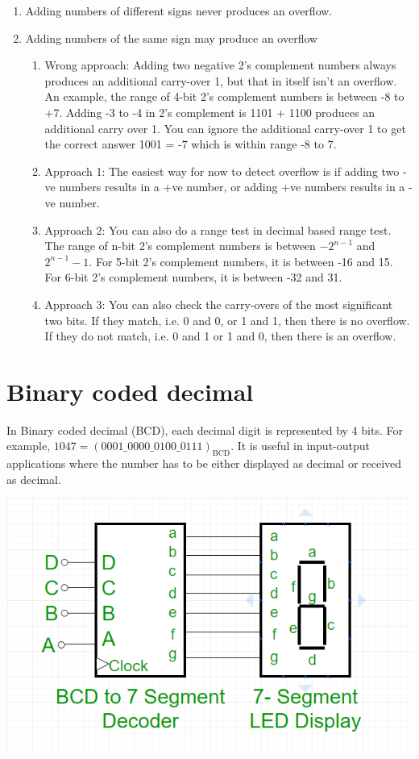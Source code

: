 \begin{enumerate}
  \item Adding numbers of different signs never produces an overflow.
  \item Adding numbers of the same sign may produce an overflow
    \begin{enumerate}
        \item Wrong approach: Adding two negative 2's complement numbers always produces an additional carry-over 1, but that in itself isn't an overflow. An example, the range of 4-bit 2's complement numbers is between -8 to +7. Adding -3 to -4 in 2's complement is 1101 + 1100 produces an additional carry over 1. You can ignore the additional carry-over 1 to get the correct answer 1001 = -7 which is within range -8 to 7.
        \item Approach 1: The easiest way for now to detect overflow is if adding two -ve numbers results in a +ve number, or adding +ve numbers results in a -ve number.
        \item Approach 2: You can also do a range test in decimal based range test. The range of n-bit 2's complement numbers is between $-2^{n-1}$ and $2^{n-1}-1$. For 5-bit 2's complement numbers, it is between -16 and 15. For 6-bit 2's complement numbers, it is between -32 and 31.
        \item Approach 3: You can also check the carry-overs of the most significant two bits. If they match, i.e. 0 and 0, or 1 and 1, then there is no overflow. If they do not match, i.e. 0 and 1 or 1 and 0, then there is an overflow.
     \end{enumerate}
\end{enumerate}



\section{Binary coded decimal}
In Binary coded decimal (BCD), each decimal digit is represented by 4 bits. For
example, $1047 = (0001\_0000\_0100\_0111)_{\text{BCD}}$. It is useful in
input-output applications where the number has to be either displayed as decimal
or received as decimal.

\includegraphics[width=0.5\linewidth]{bcdto7seg.png}

